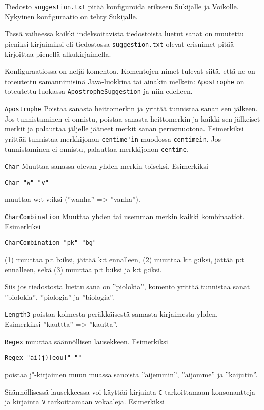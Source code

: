 \documentclass[12pt,a4paper]{scrartcl}
\begin{document}
Tiedosto \verb|suggestion.txt| pitää konfiguroida erikseen Sukijalle
ja Voikolle. Nykyinen konfiguraatio on tehty Sukijalle.

Tässä vaiheessa kaikki indeksoitavista tiedostoista luetut sanat on
muutettu pieniksi kirjaimiksi eli tiedostossa \verb|suggestion.txt|
olevat erisnimet pitää kirjoittaa pienellä alkukirjaimella.

Konfiguraatiossa on neljä komentoa. Komentojen nimet tulevat siitä,
että ne on toteutettu samannimisinä Java-luokkina tai ainakin melkein:
\verb|Apostrophe| on toteutettu luokassa \verb|ApostropheSuggestion|
ja niin edelleen.

\bigskip
\verb|Apostrophe| Poistaa sanasta heittomerkin ja yrittää tunnistaa
sanan sen jälkeen. Jos tunnistaminen ei onnistu, poistaa sanasta
heittomerkin ja kaikki sen jälkeiset merkit ja palauttaa jäljelle
jääneet merkit sanan perusmuotona. Esimerkiksi yrittää tunnistaa
merkkijonon \verb|centime'in| muodossa \verb|centimein|. Jos
tunnistaminen ei onnistu, palauttaa merkkijonon \verb|centime|.

\bigskip
\verb|Char| Muuttaa sanassa olevan yhden merkin toiseksi. Esimerkiksi

\verb|Char "w" "v"|

muuttaa w:t v:iksi (''wanha'' => ''vanha'').

\bigskip
\verb|CharCombination| Muuttaa yhden tai usemman merkin kaikki
kombinaatiot. Esimerkiksi

\verb|CharCombination "pk" "bg"|

(1) muuttaa p:t b:iksi, jättää k:t ennalleen,
(2) muuttaa k:t g:iksi, jättää p:t ennalleen, sekä
(3) muuttaa p:t b:iksi ja k:t g:iksi.

Siis jos tiedostosta luettu sana on ''piolokia'', komento yrittää
 tunnistaa sanat ''biolokia'', ''piologia'' ja ''biologia''.


\bigskip
\verb|Length3| poistaa kolmesta peräkkäisestä samasta kirjaimesta
yhden. \\ Esimerkiksi ''kauttta'' => ''kautta''.


\bigskip
\verb|Regex| muuttaa säännöllisen lausekkeen. Esimerkiksi

\verb|Regex "ai(j)[eou]" ""|

poistaa j"-kirjaimen muun muassa sanoista ''aijemmin'', ''aijomme'' ja
''kaijutin''.


Säännöllisessä lausekkeessa voi käyttää kirjainta \verb|C|
tarkoittamaan konsonantteja ja kirjainta \verb|V| tarkoittamaan
vokaaleja. Esimerkiksi
\end{document}
